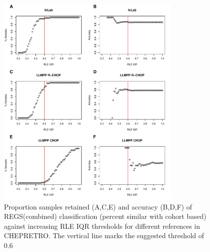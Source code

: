 \documentclass{article}
\begin{document}
\begin{figure}
	\begin{center}
		\includegraphics[width=0.8\textwidth]{figures/chep_rle_classification_regs.pdf}
	\end{center}
	\caption{Proportion samples retained (A,C,E) and accuracy (B,D,F) of REGS(combined) classification (percent similar with cohort based) against increasing RLE IQR thresholds for different references in CHEPRETRO. The vertical line marks the suggested threshold of 0.6}
	\label{fig:chep_rle_clas_regs}
\end{figure}
\end{document}
